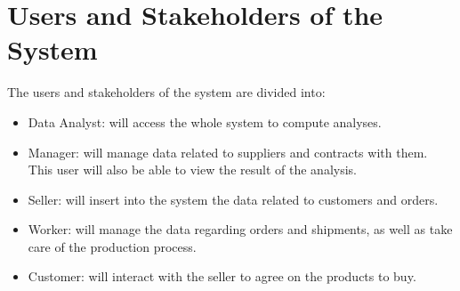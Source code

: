 \section{Users and Stakeholders of the System}
The users and stakeholders of the system are divided into:
\begin{itemize}
	\item Data Analyst: will access the whole system to compute analyses.
	\item Manager: will manage data related to suppliers and contracts with them. This user will also be able to view the result of the analysis.
	\item Seller: will insert into the system the data related to customers and orders.
	\item Worker: will manage the data regarding orders and shipments, as well as take care of the production process.
	\item Customer: will interact with the seller to agree on the products to buy.
\end{itemize}